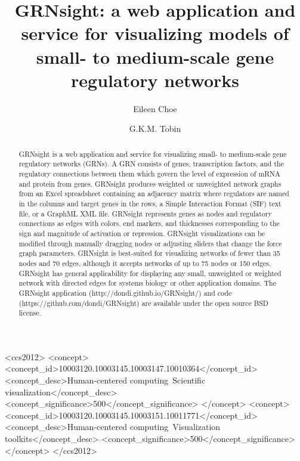 \documentclass[sigconf,review,anonymous]{acmart}
\begin{document}
\title{GRNsight: a web application and service for visualizing models of small- to medium-scale gene regulatory networks}

\author{Eileen Choe}

\author{G.K.M. Tobin}

\renewcommand{\shortauthors}{B. Trovato et. al.}

\begin{abstract}

GRNsight is a web application and service for visualizing small- to medium-scale gene regulatory networks (GRNs). A GRN consists of genes, transcription factors, and the regulatory connections between them which govern the level of expression of mRNA and protein from genes. GRNsight produces weighted or unweighted network graphs from an Excel spreadsheet containing an adjacency matrix where regulators are named in the columns and target genes in the rows, a Simple Interaction Format (SIF) text file, or a GraphML XML file. GRNsight represents genes as nodes and regulatory connections as edges with colors, end markers, and thicknesses corresponding to the sign and magnitude of activation or repression. GRNsight visualizations can be modified through manually dragging nodes or adjusting sliders that change the force graph parameters. GRNsight is best-suited for visualizing networks of fewer than 35 nodes and 70 edges, although it accepts networks of up to 75 nodes or 150 edges. GRNsight has general applicability for displaying any small, unweighted or weighted network with directed edges for systems biology or other application domains. The GRNsight application (http://dondi.github.io/GRNsight/) and code (https://github.com/dondi/GRNsight) are available under the open source BSD license.

\end{abstract}

%
%
\begin{CCSXML}
<ccs2012>
<concept>
<concept_id>10003120.10003145.10003147.10010364</concept_id>
<concept_desc>Human-centered computing~Scientific visualization</concept_desc>
<concept_significance>500</concept_significance>
</concept>
<concept>
<concept_id>10003120.10003145.10003151.10011771</concept_id>
<concept_desc>Human-centered computing~Visualization toolkits</concept_desc>
<concept_significance>500</concept_significance>
</concept>
</ccs2012>
\end{CCSXML}
\end{document}
